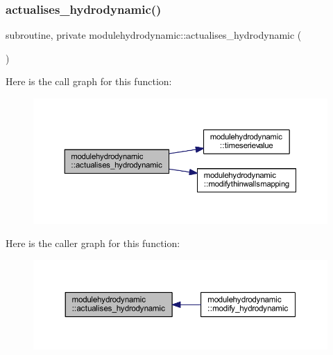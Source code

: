 \subsubsection{\texorpdfstring{actualises\+\_\+hydrodynamic()}{actualises\_hydrodynamic()}}
{\footnotesize\ttfamily subroutine, private modulehydrodynamic\+::actualises\+\_\+hydrodynamic (\begin{DoxyParamCaption}{ }\end{DoxyParamCaption})\hspace{0.3cm}{\ttfamily [private]}}

Here is the call graph for this function\+:\nopagebreak
\begin{figure}[H]
\begin{center}
\leavevmode
\includegraphics[width=350pt]{namespacemodulehydrodynamic_a106c8a097031ad23a85c1c2487284b7f_cgraph}
\end{center}
\end{figure}
Here is the caller graph for this function\+:\nopagebreak
\begin{figure}[H]
\begin{center}
\leavevmode
\includegraphics[width=350pt]{namespacemodulehydrodynamic_a106c8a097031ad23a85c1c2487284b7f_icgraph}
\end{center}
\end{figure}
\mbox{\label{namespacemodulehydrodynamic_a1df79abd6d7bd327711cac635586b443}} 
